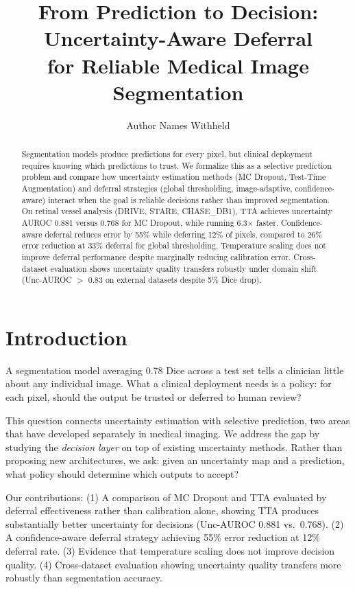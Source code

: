 \documentclass[runningheads]{llncs}
\begin{document}
\title{From Prediction to Decision: Uncertainty-Aware Deferral \\ for Reliable Medical Image Segmentation}

\author{Author Names Withheld}

\maketitle

\begin{abstract}
Segmentation models produce predictions for every pixel, but clinical deployment
requires knowing which predictions to trust. We formalize this as a selective
prediction problem and compare how uncertainty estimation methods (MC Dropout,
Test-Time Augmentation) and deferral strategies (global thresholding,
image-adaptive, confidence-aware) interact when the goal is reliable decisions
rather than improved segmentation. On retinal vessel analysis (DRIVE, STARE,
CHASE\_DB1), TTA achieves uncertainty AUROC 0.881 versus 0.768 for MC Dropout,
while running 6.3$\times$ faster. Confidence-aware deferral reduces error by
55\% while deferring 12\% of pixels, compared to 26\% error reduction at 33\%
deferral for global thresholding. Temperature scaling does not improve deferral
performance despite marginally reducing calibration error. Cross-dataset
evaluation shows uncertainty quality transfers robustly under domain shift
(Unc-AUROC $>$ 0.83 on external datasets despite 5\% Dice drop).
\end{abstract}

\section{Introduction}

A segmentation model averaging 0.78 Dice across a test set tells a clinician
little about any individual image. What a clinical deployment needs is a policy:
for each pixel, should the output be trusted or deferred to human review?

This question connects uncertainty estimation with selective prediction, two
areas that have developed separately in medical imaging. We address the gap by
studying the \emph{decision layer} on top of existing uncertainty methods.
Rather than proposing new architectures, we ask: given an uncertainty map and a
prediction, what policy should determine which outputs to accept?

Our contributions: (1) A comparison of MC Dropout and TTA evaluated by deferral
effectiveness rather than calibration alone, showing TTA produces substantially
better uncertainty for decisions (Unc-AUROC 0.881 vs.\ 0.768). (2) A
confidence-aware deferral strategy achieving 55\% error reduction at 12\%
deferral rate. (3) Evidence that temperature scaling does not improve
decision quality. (4) Cross-dataset evaluation showing uncertainty quality
transfers more robustly than segmentation accuracy.
\end{document}
